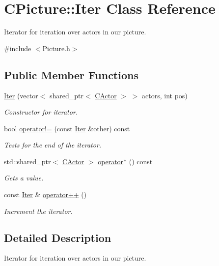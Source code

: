 \hypertarget{class_c_picture_1_1_iter}{\section{C\+Picture\+:\+:Iter Class Reference}
\label{class_c_picture_1_1_iter}
}


Iterator for iteration over actors in our picture.  




{\ttfamily \#include $<$Picture.\+h$>$}

\subsection*{Public Member Functions}
\begin{DoxyCompactItemize}
\item 
\hyperlink{class_c_picture_1_1_iter_a05b2e6b7de1c7cadfb373700685ac727}{Iter} (vector$<$ shared\+\_\+ptr$<$ \hyperlink{class_c_actor}{C\+Actor} $>$ $>$ actors, int pos)
\begin{DoxyCompactList}\small\item\em Constructor for iterator. \end{DoxyCompactList}\item 
bool \hyperlink{class_c_picture_1_1_iter_ad6825ba137bf1f8e308a14ce8372fd96}{operator!=} (const \hyperlink{class_c_picture_1_1_iter}{Iter} \&other) const 
\begin{DoxyCompactList}\small\item\em Tests for the end of the iterator. \end{DoxyCompactList}\item 
std\+::shared\+\_\+ptr$<$ \hyperlink{class_c_actor}{C\+Actor} $>$ \hyperlink{class_c_picture_1_1_iter_ab6962e9b3aada98956eda038b77ab43c}{operator$\ast$} () const 
\begin{DoxyCompactList}\small\item\em Gets a value. \end{DoxyCompactList}\item 
const \hyperlink{class_c_picture_1_1_iter}{Iter} \& \hyperlink{class_c_picture_1_1_iter_aa0b7d41d80329022d80ec605b46924c2}{operator++} ()
\begin{DoxyCompactList}\small\item\em Increment the iterator. \end{DoxyCompactList}\end{DoxyCompactItemize}


\subsection{Detailed Description}
Iterator for iteration over actors in our picture. 

